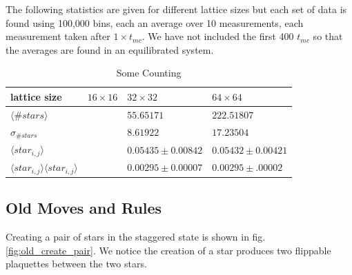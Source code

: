 \documentclass[aps,floatfix,11pt]{revtex4-1}
\begin{document}
The following statistics are given for different lattice sizes but each set of data is found using
100,000 bins, each an average over 10 measurements, each measurement taken after $1\times t_{mc}$.
We have not included the first 400 $t_{mc}$ so that the averages are found in an equilibrated
system.

\begin{table}[htp]
    \caption{Some Counting}
    \centering
    \begin{tabular}{l | l | l | l}
    \hline\hline
    lattice size                                            & $16\times 16$ & $32\times 32$             & $64\times 64$ \\ \hline
    $\langle \# stars \rangle$                              &               &  $55.65171$               & $ 222.51807 $\\ \hline
    $\sigma_{\# stars}$                                     &               &  $8.61922 $               & $ 17.23504  $\\ \hline
    $\langle star_{i,j} \rangle$                            &               &  $0.05435 \pm 0.00842 $   & $ 0.05432 \pm 0.00421 $\\ \hline
    $\langle star_{i,j} \rangle \langle star_{i,j} \rangle$ &               &  $0.00295 \pm 0.00007 $   & $ 0.00295 \pm .00002 $\\ [1ex]
    \hline
    \end{tabular}
    \label{table:counts}
\end{table}




\subsection{Old Moves and Rules}

Creating a pair of stars in the staggered state is shown in fig. \ref{fig:old_create_pair}. We notice
the creation of a star produces two flippable plaquettes between the two stars.
\end{document}

